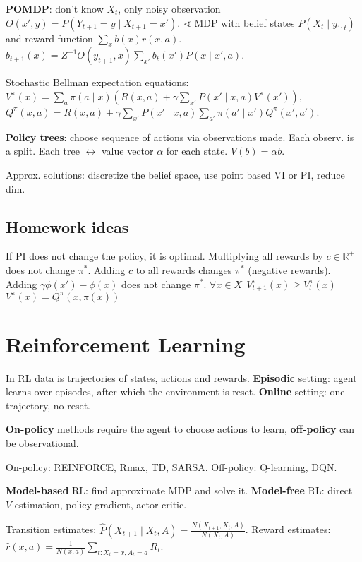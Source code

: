 \documentclass[11pt,landscape,a4paper,fleqn]{article}
\begin{document}
\begin{multicols*}{4}
\textbf{POMDP}: don't know \(X_t\), only noisy observation \(O(x', y) = P(Y_{t+1} = y \mid X_{t+1} = x')\).
\(\sphericalangle\) MDP with belief states \(P(X_t \mid y_{1:t})\) and reward function \(\sum_x b(x) r(x, a)\).
\(b_{t+1}(x) = Z^{-1} O(y_{t+1},x) \sum_{x'} b_t(x') P(x \mid x', a)\).

Stochastic Bellman expectation equations:
\(V^\pi(x) = \sum_a \pi(a \mid x)(R(x, a) + \gamma \sum_{x'} P(x' \mid x, a) V^\pi(x'))\),
\(Q^\pi(x, a) = R(x, a) + \gamma \sum_{x'} P(x' \mid x, a) \sum_{a'} \pi(a' \mid x') Q^\pi(x', a')\).

\textbf{Policy trees}: choose sequence of actions via observations made. Each observ. is a split.
Each tree \(\leftrightarrow\) value vector \(\alpha\) for each state.
\(V(b) = \alpha b\).

Approx. solutions: discretize the belief space, use point based VI or PI, reduce dim.

\subsection{Homework ideas}

If PI does not change the policy, it is optimal.
Multiplying all rewards by \(c \in \mathbb{R}^+\) does not change \(\pi^*\).
Adding \(c\) to all rewards changes \(\pi^*\) (negative rewards).
Adding \(\gamma \phi(x') - \phi(x)\) does not change \(\pi^*\).
\(\forall x \in X \ \ V^\pi_{t+1}(x) \geq V^\pi_t(x)\) \quad
\(V^\pi(x) = Q^\pi(x, \pi(x))\)

\section{Reinforcement Learning}

In RL data is trajectories of states, actions and rewards.
\textbf{Episodic} setting: agent learns over episodes, after which the environment is reset.
\textbf{Online} setting: one trajectory, no reset.

\textbf{On-policy} methods require the agent to choose actions to learn, \textbf{off-policy} can be observational.

On-policy: REINFORCE, Rmax, TD, SARSA. Off-policy: Q-learning, DQN.

\textbf{Model-based} RL: find approximate MDP and solve it.
\textbf{Model-free} RL: direct \(V\) estimation, policy gradient, actor-critic.

Transition estimates: \(\hat{P}(X_{t+1} \mid X_t, A) = \frac{N(X_{t+1}, X_t, A)}{N(X_t, A)}\).
Reward estimates: \(\hat{r}(x, a) = \frac{1}{N(x, a)} \sum\limits_{t : X_t = x, A_t = a} R_t\).


\end{multicols*}
\end{document}
